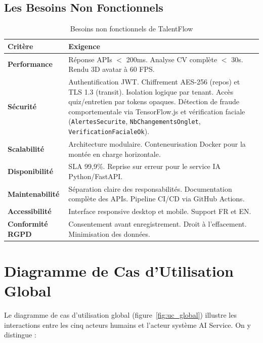 \subsection{Les Besoins Non Fonctionnels}

\begin{table}[h]
\centering
\renewcommand{\arraystretch}{1.6}
\begin{tabular}{|p{3cm}|p{10cm}|}
\hline
\textbf{Critère} & \textbf{Exigence} \\
\hline
\textbf{Performance} & Réponse APIs $<$ 200ms. Analyse CV complète $<$ 30s.
Rendu 3D avatar à 60 FPS. \\
\hline
\textbf{Sécurité} & Authentification JWT. Chiffrement AES-256 (repos) et TLS 1.3 (transit).
Isolation logique par tenant. Accès quiz/entretien par tokens opaques.
Détection de fraude comportementale via TensorFlow.js et vérification faciale
(\texttt{AlertesSecurite}, \texttt{NbChangementsOnglet}, \texttt{VerificationFacialeOk}). \\
\hline
\textbf{Scalabilité} & Architecture modulaire. Conteneurisation Docker pour la montée
en charge horizontale. \\
\hline
\textbf{Disponibilité} & SLA 99,9\%. Reprise sur erreur pour le service IA Python/FastAPI. \\
\hline
\textbf{Maintenabilité} & Séparation claire des responsabilités. Documentation complète
des APIs. Pipeline CI/CD via GitHub Actions. \\
\hline
\textbf{Accessibilité} & Interface responsive desktop et mobile. Support FR et EN. \\
\hline
\textbf{Conformité RGPD} & Consentement avant enregistrement. Droit à l'effacement.
Minimisation des données. \\
\hline
\end{tabular}
\caption{Besoins non fonctionnels de TalentFlow}
\label{tab:nfr}
\end{table}

\section{Diagramme de Cas d'Utilisation Global}

Le diagramme de cas d'utilisation global (figure~\ref{fig:uc_global}) illustre les
interactions entre les cinq acteurs humains et l'acteur système AI Service. On y distingue :

